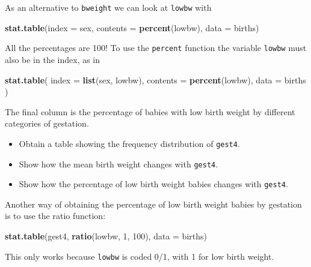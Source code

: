 \documentclass[
]{book}
\newenvironment{Shaded}{\begin{snugshade}}{\end{snugshade}}
\newcommand{\AttributeTok}[1]{\textcolor[rgb]{0.13,0.29,0.53}{#1}}
\newcommand{\DecValTok}[1]{\textcolor[rgb]{0.00,0.00,0.81}{#1}}
\newcommand{\FunctionTok}[1]{\textcolor[rgb]{0.13,0.29,0.53}{\textbf{#1}}}
\newcommand{\NormalTok}[1]{#1}
\providecommand{\tightlist}{%
  \setlength{\itemsep}{0pt}\setlength{\parskip}{0pt}}
\begin{document}
As an alternative to \texttt{bweight} we can look at \texttt{lowbw} with

\begin{Shaded}
\begin{Highlighting}[]
\FunctionTok{stat.table}\NormalTok{(}\AttributeTok{index =}\NormalTok{ sex, }\AttributeTok{contents =} \FunctionTok{percent}\NormalTok{(lowbw), }\AttributeTok{data =}\NormalTok{ births)}
\end{Highlighting}
\end{Shaded}

All the percentages are 100! To use the \texttt{percent} function the variable \texttt{lowbw} must also be in the index, as in

\begin{Shaded}
\begin{Highlighting}[]
\FunctionTok{stat.table}\NormalTok{(}
  \AttributeTok{index =} \FunctionTok{list}\NormalTok{(sex, lowbw), }
  \AttributeTok{contents =} \FunctionTok{percent}\NormalTok{(lowbw), }
  \AttributeTok{data =}\NormalTok{ births}
\NormalTok{)}
\end{Highlighting}
\end{Shaded}

The final column is the percentage of babies with low birth weight by different categories of gestation.

\begin{itemize}
\tightlist
\item
  Obtain a table showing the frequency distribution of \texttt{gest4}.
\item
  Show how the mean birth weight changes with \texttt{gest4}.
\item
  Show how the percentage of low birth weight babies changes with \texttt{gest4}.
\end{itemize}

Another way of obtaining the percentage of low birth weight babies by
gestation is to use the ratio function:

\begin{Shaded}
\begin{Highlighting}[]
\FunctionTok{stat.table}\NormalTok{(gest4, }\FunctionTok{ratio}\NormalTok{(lowbw, }\DecValTok{1}\NormalTok{, }\DecValTok{100}\NormalTok{), }\AttributeTok{data =}\NormalTok{ births)}
\end{Highlighting}
\end{Shaded}

This only works because \texttt{lowbw} is coded 0/1, with 1 for low birth
weight.
\end{document}
